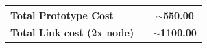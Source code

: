 \documentclass[master,oneside,en,oldtitlepage]{dyplompwr}
\begin{document}
\begin{appendices}
\begin{table}[htbp]
\begin{tabularx}{\textwidth}{@{} X X c @{}}
    \midrule
    \textbf{Total Prototype Cost} & & \textbf{$\sim$550.00} \\
    \midrule
    \textbf{Total Link cost (2x node)} & & \textbf{$\sim$1100.00} \\
    \bottomrule
  \end{tabularx}
\end{table}

\newpage
{}
\label{appendix:CAD} %




\end{appendices}

\end{document}
